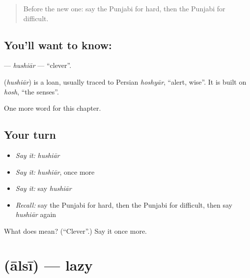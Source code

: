 \label{lesson:PA-C144-hushiar}



\begin{quote}
Before the new one: say the Punjabi for hard, then the Punjabi for difficult.
\end{quote}

\subsection*{You'll want to know: }
\textbf{} — \emph{hushiār} — \textquotedblleft{}clever\textquotedblright{}.

\begin{cousinweb}
\textbf{} (\emph{hushiār}) is a loan, usually traced to Persian \emph{hoshyār}, \textquotedblleft{}alert, wise\textquotedblright{}. It is built on \emph{hosh}, \textquotedblleft{}the senses\textquotedblright{}.
\end{cousinweb}

\begin{grammarlens}[title={What you've built}]
One more word for this chapter.
\end{grammarlens}

\subsection*{Your turn}
\begin{itemize}
\raggedright
  \item \emph{Say it:} \emph{hushiār}
  \item \emph{Say it:} \emph{hushiār}, once more
  \item \emph{Say it:} say \emph{hushiār}
  \item \emph{Recall:} say the Punjabi for hard, then the Punjabi for difficult, then say \emph{hushiār} again
\end{itemize}

\begin{tcolorbox}[breakable,colback=teal!4,colframe=teal!35!black,title={Before you move on}]
What does  mean? (\textquotedblleft{}Clever\textquotedblright{}.) Say it once more.
\end{tcolorbox}
\section[\texorpdfstring{\pa{ਆਲਸੀ} (ālsī)}{ਆਲਸੀ (ālsī)}]{ (ālsī) — lazy}

\label{lesson:PA-C144-alsi}



